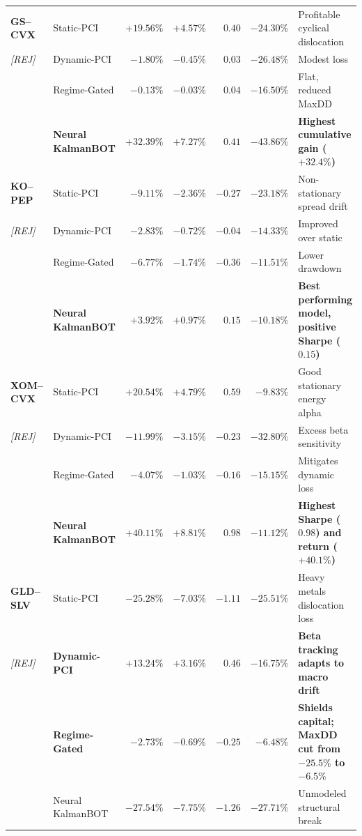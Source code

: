 \documentclass[11pt, a4paper]{article}
\begin{document}
\begin{center}
\begin{longtable}{llrrrrp{4.8cm}}
\midrule
\textbf{GS--CVX} & Static-PCI & $+19.56\%$ & $+4.57\%$ & $0.40$ & $-24.30\%$ & Profitable cyclical dislocation \\
\small\textit{[REJ]} & Dynamic-PCI & $-1.80\%$ & $-0.45\%$ & $0.03$ & $-26.48\%$ & Modest loss \\
 & Regime-Gated & $-0.13\%$ & $-0.03\%$ & $0.04$ & $-16.50\%$ & Flat, reduced MaxDD \\
 & \textbf{Neural KalmanBOT} & $\mathbf{+32.39\%}$ & $\mathbf{+7.27\%}$ & $\mathbf{0.41}$ & $\mathbf{-43.86\%}$ & \textbf{Highest cumulative gain ($+32.4\%$)} \\
\midrule
\textbf{KO--PEP} & Static-PCI & $-9.11\%$ & $-2.36\%$ & $-0.27$ & $-23.18\%$ & Non-stationary spread drift \\
\small\textit{[REJ]} & Dynamic-PCI & $-2.83\%$ & $-0.72\%$ & $-0.04$ & $-14.33\%$ & Improved over static \\
 & Regime-Gated & $-6.77\%$ & $-1.74\%$ & $-0.36$ & $-11.51\%$ & Lower drawdown \\
 & \textbf{Neural KalmanBOT} & $\mathbf{+3.92\%}$ & $\mathbf{+0.97\%}$ & $\mathbf{0.15}$ & $\mathbf{-10.18\%}$ & \textbf{Best performing model, positive Sharpe ($0.15$)} \\
\midrule
\textbf{XOM--CVX} & Static-PCI & $+20.54\%$ & $+4.79\%$ & $0.59$ & $-9.83\%$ & Good stationary energy alpha \\
\small\textit{[REJ]} & Dynamic-PCI & $-11.99\%$ & $-3.15\%$ & $-0.23$ & $-32.80\%$ & Excess beta sensitivity \\
 & Regime-Gated & $-4.07\%$ & $-1.03\%$ & $-0.16$ & $-15.15\%$ & Mitigates dynamic loss \\
 & \textbf{Neural KalmanBOT} & $\mathbf{+40.11\%}$ & $\mathbf{+8.81\%}$ & $\mathbf{0.98}$ & $\mathbf{-11.12\%}$ & \textbf{Highest Sharpe ($0.98$) and return ($+40.1\%$)} \\
\midrule
\textbf{GLD--SLV} & Static-PCI & $-25.28\%$ & $-7.03\%$ & $-1.11$ & $-25.51\%$ & Heavy metals dislocation loss \\
\small\textit{[REJ]} & \textbf{Dynamic-PCI} & $\mathbf{+13.24\%}$ & $\mathbf{+3.16\%}$ & $\mathbf{0.46}$ & $\mathbf{-16.75\%}$ & \textbf{Beta tracking adapts to macro drift} \\
 & \textbf{Regime-Gated} & $\mathbf{-2.73\%}$ & $\mathbf{-0.69\%}$ & $\mathbf{-0.25}$ & $\mathbf{-6.48\%}$ & \textbf{Shields capital; MaxDD cut from $-25.5\%$ to $-6.5\%$} \\
 & Neural KalmanBOT & $-27.54\%$ & $-7.75\%$ & $-1.26$ & $-27.71\%$ & Unmodeled structural break \\

\end{longtable}
\end{center}
\end{document}
